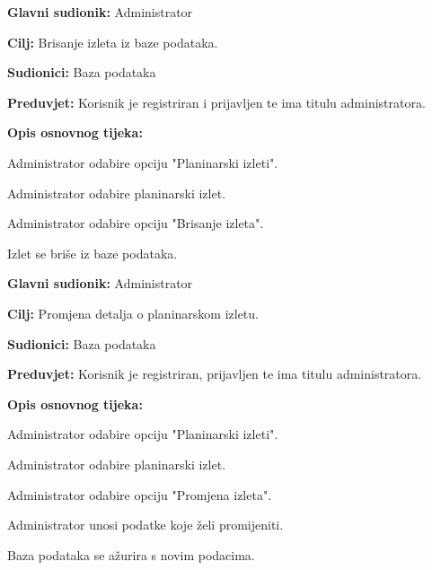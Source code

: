 	
	
		\noindent {}
		\begin{packed_item}
			
			\item \textbf{Glavni sudionik: } Administrator
			\item  \textbf{Cilj:} Brisanje izleta iz baze podataka.
			\item  \textbf{Sudionici:} Baza podataka
			\item  \textbf{Preduvjet:} Korisnik je registriran i prijavljen te ima titulu administratora.
			\item  \textbf{Opis osnovnog tijeka:}
			
			\item[] \begin{packed_enum}
				
				\item Administrator odabire opciju "Planinarski izleti".
				\item Administrator odabire planinarski izlet.
				\item Administrator odabire opciju "Brisanje izleta".
				\item Izlet se briše iz baze podataka.
				
				
			\end{packed_enum}
		\end{packed_item}
	
	
	
		\noindent \underbar{\textbf{UC31 - Promjena izleta}}
		\begin{packed_item}
			
			\item \textbf{Glavni sudionik: } Administrator
			\item  \textbf{Cilj:} Promjena detalja o planinarskom izletu.
			\item  \textbf{Sudionici:} Baza podataka
			\item  \textbf{Preduvjet:} Korisnik je registriran, prijavljen te ima titulu administratora.
			\item  \textbf{Opis osnovnog tijeka:}
			
			\item[] \begin{packed_enum}
				
				\item Administrator odabire opciju "Planinarski izleti".
				\item Administrator odabire planinarski izlet.
				\item Administrator odabire opciju "Promjena izleta".
				\item Administrator unosi podatke koje želi promijeniti.
				\item Baza podataka se ažurira s novim podacima.
				
				
			\end{packed_enum}
		\end{packed_item}
	
